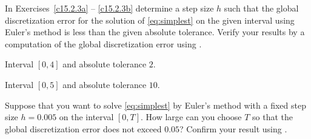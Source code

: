 \documentclass{ximera}
\begin{document}
\noindent In Exercises~\ref{c15.2.3a} -- \ref{c15.2.3b}
determine a step size $h$ such that the global discretization error
for the solution of \eqref{eq:simplest} on the given interval using 
Euler's method is less than the given absolute tolerance.  Verify 
your results by a computation of the global discretization error 
using \Matlabp.
\begin{exercise} \label{c15.2.3a}
Interval $[0,4]$ and absolute tolerance $2$.
\end{exercise}
\begin{exercise} \label{c15.2.3b}
Interval $[0,5]$ and absolute tolerance $10$.
\end{exercise}

\begin{exercise} \label{c15.2.4}
Suppose that you want to solve \eqref{eq:simplest} by Euler's
method with a fixed step size $h=0.005$ on the interval $[0,T]$.  
How large can you choose $T$ so that the global discretization
error does not exceed $0.05$?  Confirm your result using \Matlabp.
\end{exercise}
\end{document}
